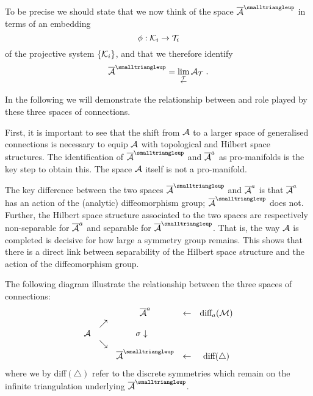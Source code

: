 \documentclass[12pt]{article}
\newcommand{\nn}{\nonumber}
\def\s{\sigma}
\def\ca{{\cal A}}
\def\ck{{\cal K}}
\def\cm{{\cal M}}
\def\ct{{\cal T}}
\begin{document}
To be precise we should state that we now think of the space $\overline{\ca}^{\smalltriangleup}$ in terms of an embedding
\[
\phi:\ck_i\rightarrow \ct_i
\]
of the projective system $\{\ck_i\}$,
and that we therefore identify
\[
\overline{\ca}^{\smalltriangleup}=\lim_{\stackrel{\ct}{\leftarrow}}\ca_\ct\;.
\]


In the following we will demonstrate the relationship between and role played by these three spaces of connections.

First, it is important to see that the shift from $\ca$ to a larger space of generalised connections is necessary to equip $\ca$ with topological and Hilbert space structures. The identification of $\overline{\ca}^{\smalltriangleup}$ and $\overline{\ca}^{\small a}$ as pro-manifolds is the key step to obtain this. The space $\ca$ itself is not a pro-manifold.

The key difference between the two spaces $\overline{\ca}^{\smalltriangleup}$ and $\overline{\ca}^{\small a}$ is that $\overline{\ca}^{\small a}$ has an action of the (analytic) diffeomorphism group; $\overline{\ca}^{\smalltriangleup}$ does not. Further, the Hilbert space structure associated to the two spaces are respectively non-separable for $\overline{\ca}^{\small a}$ and separable for $\overline{\ca}^{\smalltriangleup}$. That is, the way $\ca$ is completed is decisive for how large a symmetry group remains. This shows that there is a direct link between separability of the Hilbert space structure and the action of the diffeomorphism group.



The following diagram illustrate the relationship between the three spaces of connections:
\[
\begin{array}{ccccc}
&&\overline{\ca}^{\small a}&\leftarrow& \mbox{diff}_{\small a}(\cm)\nn\\
&\nearrow&&& \nn\\
\ca &&\hspace{-3mm}\s\downarrow && \nn\\
&\searrow &&& \nn\\
&&\overline{\ca}^{\smalltriangleup}&\leftarrow& \mbox{diff}(\triangle)
\end{array}
\]
where we by diff$(\triangle)$ refer to the discrete symmetries which remain on the infinite triangulation underlying $\overline{\ca}^{\smalltriangleup}$.
\end{document}
